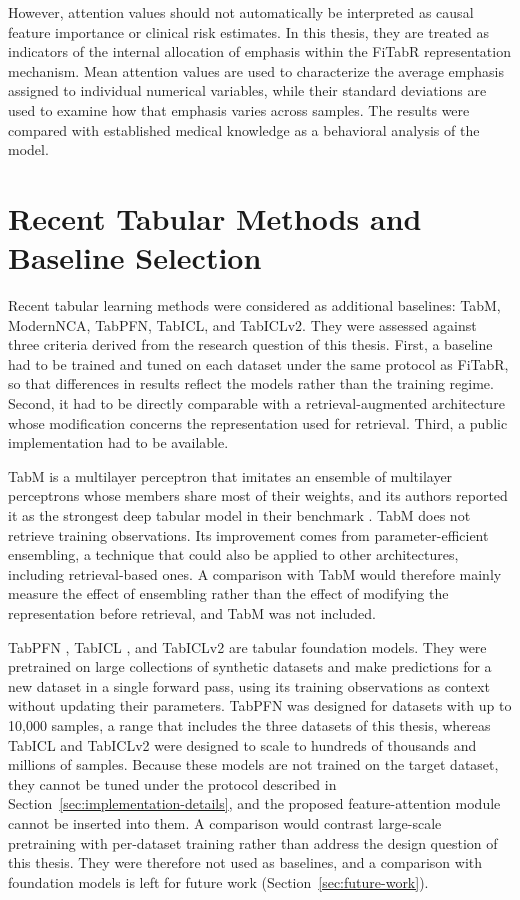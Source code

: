 \documentclass[11pt,a4paper,oneside, openany, reqno, chapter, nokorean]{oblivoir}
\theoremstyle{definition}
\theoremstyle{remark}
\numberwithin{equation}{chapter}
\theoremstyle{definition}
\theoremstyle{remark}
\theoremstyle{definition}
\begin{document}
However, attention values should not automatically be interpreted as causal
feature importance or clinical risk estimates. In this thesis, they are treated
as indicators of the internal allocation of emphasis within the FiTabR
representation mechanism. Mean attention values are used to characterize the
average emphasis assigned to individual numerical variables, while their
standard deviations are used to examine how that emphasis varies across
samples. The results were compared with established
medical knowledge as a behavioral analysis of the model.

\section{Recent Tabular Methods and Baseline Selection}
\label{sec:recent-methods}
Recent tabular learning methods were considered as additional baselines:
TabM, ModernNCA, TabPFN, TabICL, and TabICLv2. They were assessed against
three criteria derived from the research question of this thesis. First, a
baseline had to be trained and tuned on each dataset under the same protocol
as FiTabR, so that differences in results reflect the models rather than the
training regime. Second, it had to be directly comparable with a
retrieval-augmented architecture whose modification concerns the
representation used for retrieval. Third, a public implementation had to be
available.

TabM is a multilayer perceptron that imitates an ensemble of multilayer
perceptrons whose members share most of their weights, and its authors
reported it as the strongest deep tabular model in their benchmark
\cite{gorishniy2025tabm}. TabM does not retrieve training observations. Its
improvement comes from parameter-efficient ensembling, a technique that could
also be applied to other architectures, including retrieval-based ones. A
comparison with TabM would therefore mainly measure the effect of ensembling
rather than the effect of modifying the representation before retrieval, and
TabM was not included.

TabPFN \cite{hollmann2025tabpfn}, TabICL \cite{qu2025tabicl}, and TabICLv2
\cite{qu2026tabiclv2} are tabular foundation models. They were pretrained on
large collections of synthetic datasets and make predictions for a new dataset
in a single forward pass, using its training observations as context without
updating their parameters. TabPFN was designed for datasets with up to 10,000
samples, a range that includes the three datasets of this thesis, whereas
TabICL and TabICLv2 were designed to scale to hundreds of thousands and
millions of samples. Because these models are not trained on the target
dataset, they cannot be tuned under the protocol described in
Section~\ref{sec:implementation-details}, and the proposed feature-attention
module cannot be inserted into them. A comparison would contrast large-scale
pretraining with per-dataset training rather than address the design question
of this thesis. They were therefore not used as baselines, and a comparison
with foundation models is left for future work
(Section~\ref{sec:future-work}).
\end{document}
